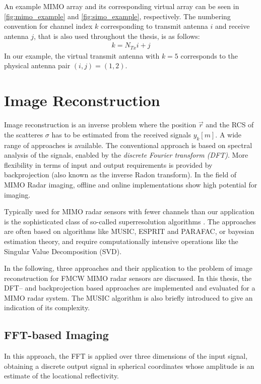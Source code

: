 An example MIMO array and its corresponding virtual array can be seen in \cref{fig:mimo_example} and \cref{fig:simo_example}, respectively.
The numbering convention for channel index $k$ corresponding to transmit antenna $i$ and receive antenna $j$,
that is also used throughout the thesis, is as follows:
\begin{align}
    k = N_{Tx}i + j \label{eq:kij}
\end{align}
In our example, the virtual transmit antenna with $k=5$ corresponds to the physical antenna pair $(i,j)=(1,2)$. \\


\section{Image Reconstruction}
Image reconstruction is an inverse problem where the position $\vec r$ and the RCS of the scatteres $\sigma$
has to be estimated from the received signals $y_k[m]$.
A wide range of approaches is available.
The conventional approach is based on spectral analysis of the signals,
enabled by the \emph{discrete Fourier transform (DFT)}.
More flexibility in terms of input and output requirements
is provided by backprojection (also known as the inverse Radon transform).
In the field of MIMO Radar imaging, offline \parencite{ren_three-dimensional_2021, farfield_bp}
and online \parencite{realtime_bp} implementations show high potential for imaging.

Typically used for MIMO radar sensors with fewer channels than our application
is the sophisticated class of so-called superresolution algorithms
\parencite{wang_2d_2021, odendaal_two-dimensional_1994,paulraj_estimation_1985,
    information_department_naval_command_college_nanjing_210016_china_two-dimensional_2017,
    seo_bayesian_2021, liu_sparse_2020, kim_joint_2015, gao_mimo-sar_2021,vasudevan_hierarchical_2019}.
The approaches are often based on algorithms like MUSIC, ESPRIT and PARAFAC, or bayesian estimation theory,
and require computationally intensive operations like the Singular Value Decomposition (SVD).

In the following, three approaches and their application to
the problem of image reconstruction for FMCW MIMO radar sensors are discussed.
In this thesis, the DFT-- and backprojection based approaches
are implemented and evaluated for a MIMO radar system.
The MUSIC algorithm is also briefly introduced to give an indication of its complexity.

\subsection{FFT-based Imaging}
\label{sec:dft_imaging_theory}
In this approach, the FFT is applied over three dimensions of the input signal,
obtaining a discrete output signal in spherical coordinates whose amplitude is an estimate of the locational reflectivity.

